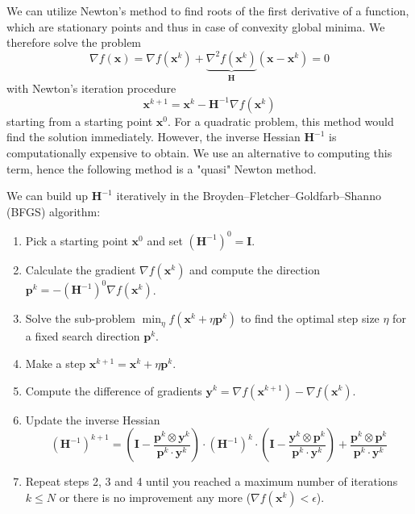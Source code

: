 We can utilize Newton's method to find roots of the first derivative of a function, which are stationary points and thus in case of convexity global minima.
We therefore solve the problem 
\begin{equation}
    \nabla f(\mathbf{x}) = \nabla f(\mathbf{x}^k) + \underbrace{\nabla^2 f(\mathbf{x}^k)}_{\mathbf{H}} (\mathbf{x}-\mathbf{x}^k) = 0
\end{equation}
with Newton's iteration procedure 
\begin{equation}
    \mathbf{x}^{k+1} = \mathbf{x}^k  - \mathbf{H}^{-1} \nabla f(\mathbf{x}^k) 
\end{equation}
starting from a starting point $\mathbf{x}^0$. For a quadratic problem, this method would find the solution immediately. However, the inverse Hessian $\mathbf{H}^{-1}$ is computationally expensive to obtain. We use an alternative to computing this term, hence the following method is a "quasi" Newton method. 

We can build up $\mathbf{H}^{-1}$ iteratively in the Broyden–Fletcher–Goldfarb–Shanno (BFGS) \cite{Broyden1970, Fletcher1970, Goldfarb1970, Shanno1970} algorithm: 
\begin{enumerate}
    \item Pick a starting point $\mathbf{x}^0$ and set $(\mathbf{H}^{-1})^0=\mathbf{I}$.
    \item Calculate the gradient $\nabla f(\mathbf{x}^k)$ and compute the direction $\mathbf{p}^k = - (\mathbf{H}^{-1})^0 \nabla f(\mathbf{x}^k)$.
    \item Solve the sub-problem $\min_{\eta} f(\mathbf{x}^k + \eta \mathbf{p}^k)$ to find the optimal step size $\eta$ for a fixed search direction $\mathbf{p}^k$.
    \item Make a step $\mathbf{x}^{k+1} = \mathbf{x}^k + \eta \mathbf{p}^k$.
    \item Compute the difference of gradients $ \mathbf{y}^k = \nabla f(\mathbf{x}^{k+1}) - \nabla f(\mathbf{x}^k)$.
    \item Update the inverse Hessian 
    \begin{equation}
        \nonumber
        (\mathbf{H}^{-1})^{k+1} = 
            \left(\mathbf{I} - \frac{\mathbf{p}^k \otimes \mathbf{y}^k}{\mathbf{p}^k \cdot \mathbf{y}^k} \right)
            \cdot
            (\mathbf{H}^{-1})^k
            \cdot
            \left(\mathbf{I} - \frac{\mathbf{y}^k \otimes \mathbf{p}^k}{\mathbf{p}^k \cdot \mathbf{y}^k} \right) 
            + 
            \frac{\mathbf{p}^k \otimes \mathbf{p}^k}{\mathbf{p}^k \cdot \mathbf{y}^k}
    \end{equation}
    \item Repeat steps 2, 3 and 4 until you reached a maximum number of iterations $k \le N$ or there is no improvement any more ($ \nabla f(\mathbf{x}^k) < \epsilon$). 
\end{enumerate}

